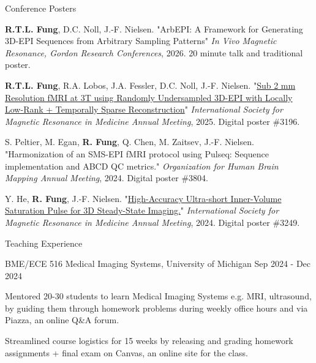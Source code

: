\documentclass{resume}
\begin{document}
\begin{rSection}{Conference Posters}
\begin{rConference}
    \item \textbf{R.T.L. Fung}, D.C. Noll, J.-F. Nielsen.
    "ArbEPI: A Framework for Generating 3D-EPI Sequences from Arbitrary Sampling Patterns"
    \textit{In Vivo Magnetic Resonance, Gordon Research Conferences}, 2026. 20 minute talk and traditional poster.

    \item \textbf{R.T.L. Fung}, R.A. Lobos, J.A. Fessler, D.C. Noll, J.-F. Nielsen.
    "\href{https://archive.ismrm.org/2025/3196.html}{Sub 2 mm Resolution fMRI at 3T using Randomly Undersampled 3D-EPI with Locally Low-Rank + Temporally Sparse Reconstruction}"
    \textit{International Society for Magnetic Resonance in Medicine Annual Meeting}, 2025. Digital poster \#3196.

    \item S. Peltier, M. Egan, \textbf{R. Fung}, Q. Chen, M. Zaitsev, J.-F. Nielsen.
    "Harmonization of an SMS-EPI fMRI protocol using Pulseq: Sequence implementation and ABCD QC metrics."
    \textit{Organization for Human Brain Mapping Annual Meeting}, 2024. Digital poster \#3804.

    \item Y. He, \textbf{R. Fung}, J.-F. Nielsen.
    "\href{https://archive.ismrm.org/2024/3249.html}{High-Accuracy Ultra-short Inner-Volume Saturation Pulse for 3D Steady-State Imaging.}"
    \textit{International Society for Magnetic Resonance in Medicine Annual Meeting}, 2024. Digital poster \#3249.
\end{rConference}
\end{rSection}

\begin{rSection}{Teaching Experience}
    \begin{rSubsection}{BME/ECE 516 Medical Imaging Systems}{, University of Michigan \hfill {Sep 2024 - Dec 2024}}
        \item[$\bullet$] Mentored 20-30 students to learn Medical Imaging Systems e.g. MRI, ultrasound, by guiding them through homework problems during weekly office hours and via Piazza, an online Q\&A forum.
        \item[$\bullet$] Streamlined course logistics for 15 weeks by releasing and grading homework assignments + final exam on Canvas, an online site for the class.
    \end{rSubsection}
\end{rSection}
\end{document}
